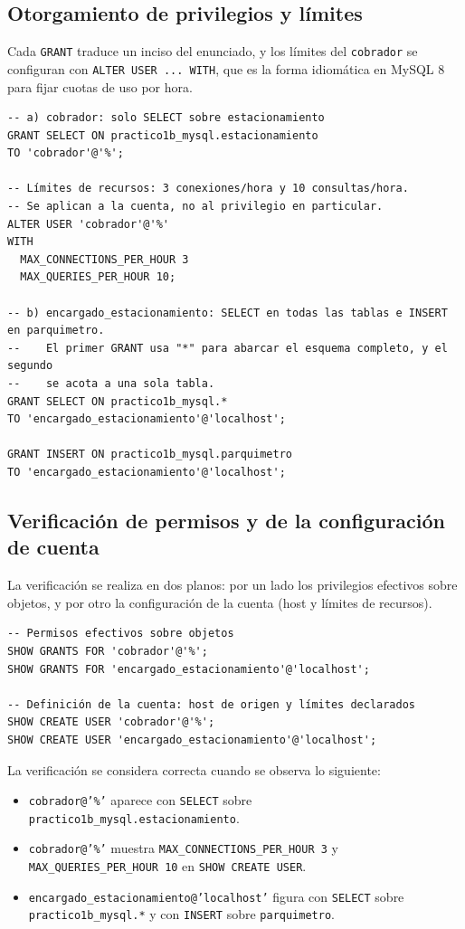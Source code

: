 \documentclass[11pt,a4paper]{article}
\begin{document}
\subsection{Otorgamiento de privilegios y límites}

Cada \texttt{GRANT} traduce un inciso del enunciado, y los límites del \texttt{cobrador} se configuran con \texttt{ALTER USER ... WITH}, que es la forma idiomática en MySQL 8 para fijar cuotas de uso por hora.

\begin{lstlisting}
-- a) cobrador: solo SELECT sobre estacionamiento
GRANT SELECT ON practico1b_mysql.estacionamiento
TO 'cobrador'@'%';

-- Límites de recursos: 3 conexiones/hora y 10 consultas/hora.
-- Se aplican a la cuenta, no al privilegio en particular.
ALTER USER 'cobrador'@'%'
WITH
  MAX_CONNECTIONS_PER_HOUR 3
  MAX_QUERIES_PER_HOUR 10;

-- b) encargado_estacionamiento: SELECT en todas las tablas e INSERT en parquimetro.
--    El primer GRANT usa "*" para abarcar el esquema completo, y el segundo
--    se acota a una sola tabla.
GRANT SELECT ON practico1b_mysql.*
TO 'encargado_estacionamiento'@'localhost';

GRANT INSERT ON practico1b_mysql.parquimetro
TO 'encargado_estacionamiento'@'localhost';
\end{lstlisting}

\subsection{Verificación de permisos y de la configuración de cuenta}

La verificación se realiza en dos planos: por un lado los privilegios efectivos sobre objetos, y por otro la configuración de la cuenta (host y límites de recursos).

\begin{lstlisting}
-- Permisos efectivos sobre objetos
SHOW GRANTS FOR 'cobrador'@'%';
SHOW GRANTS FOR 'encargado_estacionamiento'@'localhost';

-- Definición de la cuenta: host de origen y límites declarados
SHOW CREATE USER 'cobrador'@'%';
SHOW CREATE USER 'encargado_estacionamiento'@'localhost';
\end{lstlisting}

La verificación se considera correcta cuando se observa lo siguiente:

\begin{itemize}
    \item \texttt{cobrador@'\%'} aparece con \texttt{SELECT} sobre \texttt{practico1b\_mysql.estacionamiento}.
    \item \texttt{cobrador@'\%'} muestra \texttt{MAX\_CONNECTIONS\_PER\_HOUR 3} y \texttt{MAX\_QUERIES\_PER\_HOUR 10} en \texttt{SHOW CREATE USER}.
    \item \texttt{encargado\_estacionamiento@'localhost'} figura con \texttt{SELECT} sobre \texttt{practico1b\_mysql.*} y con \texttt{INSERT} sobre \texttt{parquimetro}.
\end{itemize}
\end{document}
